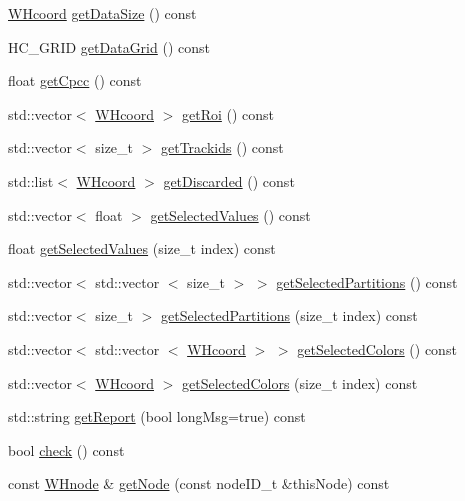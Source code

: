 \begin{DoxyCompactItemize}
\hyperlink{classWHcoord}{\-W\-Hcoord} \hyperlink{classWHtree_a7ced07989d496f8900eb619e62222570}{get\-Data\-Size} () const 
\item 
\-H\-C\-\_\-\-G\-R\-I\-D \hyperlink{classWHtree_aa99f18419299fe7c91bed3b08e70a9c7}{get\-Data\-Grid} () const 
\item 
float \hyperlink{classWHtree_a68f9b4e2111ccaaaf6e2c4be41509ba3}{get\-Cpcc} () const 
\item 
std\-::vector$<$ \hyperlink{classWHcoord}{\-W\-Hcoord} $>$ \hyperlink{classWHtree_a64c80a0c7c5ebad5b01d372c2bf10c67}{get\-Roi} () const 
\item 
std\-::vector$<$ size\-\_\-t $>$ \hyperlink{classWHtree_af0f3ea76d2b9c4a917bfc8ed74adfd41}{get\-Trackids} () const 
\item 
std\-::list$<$ \hyperlink{classWHcoord}{\-W\-Hcoord} $>$ \hyperlink{classWHtree_ac4ba3c3512cec27c41d1ebe1b6d55061}{get\-Discarded} () const 
\item 
std\-::vector$<$ float $>$ \hyperlink{classWHtree_abb64d6b8f300437e56ffcf068f56cde2}{get\-Selected\-Values} () const 
\item 
float \hyperlink{classWHtree_a938a77f4db0ad79692891955b66b2b20}{get\-Selected\-Values} (size\-\_\-t index) const 
\item 
std\-::vector$<$ std\-::vector\*
$<$ size\-\_\-t $>$ $>$ \hyperlink{classWHtree_a176e1b203ea2b839843fc0f59ae69a6a}{get\-Selected\-Partitions} () const 
\item 
std\-::vector$<$ size\-\_\-t $>$ \hyperlink{classWHtree_a6bf8c646f9bcde88e50811556cd017d4}{get\-Selected\-Partitions} (size\-\_\-t index) const 
\item 
std\-::vector$<$ std\-::vector\*
$<$ \hyperlink{classWHcoord}{\-W\-Hcoord} $>$ $>$ \hyperlink{classWHtree_a7c05c467516c4ca7520d973daba3af0d}{get\-Selected\-Colors} () const 
\item 
std\-::vector$<$ \hyperlink{classWHcoord}{\-W\-Hcoord} $>$ \hyperlink{classWHtree_a19ea8b2bab791e07895590b8d53eddb6}{get\-Selected\-Colors} (size\-\_\-t index) const 
\item 
std\-::string \hyperlink{classWHtree_a0e25349a1ace7d47021d763cfae1852b}{get\-Report} (bool long\-Msg=true) const 
\item 
bool \hyperlink{classWHtree_a668db7c1368f273ef462e44bff2fc91d}{check} () const 
\item 
const \hyperlink{classWHnode}{\-W\-Hnode} \& \hyperlink{classWHtree_a2a024be0e6cf9b50a787aa3335d17449}{get\-Node} (const node\-I\-D\-\_\-t \&this\-Node) const 
\item 

\end{DoxyCompactItemize}
